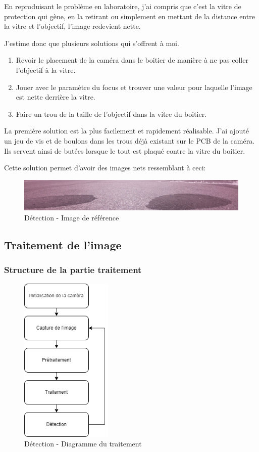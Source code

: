 En reproduisant le problème en laboratoire, j'ai compris que c'est la vitre de protection qui gène, en la retirant ou simplement en mettant de la distance entre la vitre et l'objectif, l'image redevient nette.

J'estime donc que plusieurs solutions qui s'offrent à moi.
\begin{enumerate}
    \item Revoir le placement de la caméra dans le boitier de manière à ne pas coller l'objectif à la vitre.
    \item Jouer avec le paramètre du focus et trouver une valeur pour laquelle l'image est nette derrière la vitre.
    \item Faire un trou de la taille de l'objectif dans la vitre du boitier.
\end{enumerate}

La première solution est la plus facilement et rapidement réalisable. J'ai ajouté un jeu de vis et de boulons dans les trous déjà existant sur le PCB de la caméra.
Ils servent ainsi de butées lorsque le tout est plaqué contre la vitre du boitier.

Cette solution permet d'avoir des images nets ressemblant à ceci:
\begin{figure}[H]
    \centering
    \includegraphics[width=13cm]{assets/figures/oil_test.png}
    \caption{Détection - Image de référence}
\end{figure}
\newpage

\subsection{Traitement de l'image}
\subsubsection{Structure de la partie traitement}
\begin{figure}[H]
    \centering
    \includegraphics[height=8cm]{assets/figures/diagramme_traitement.png}
    \caption{Détection - Diagramme du traitement}
\end{figure}

